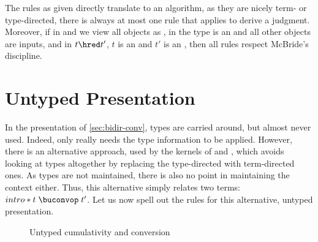 The rules as given directly translate to an algorithm, as they are nicely term- or type-directed,
\ie there is always at most one rule that applies to derive a judgment. Moreover,
if in  and  we view all objects as ,%
%
in  the type is an  and all other objects are inputs,
and in  $t \hred t'$, $t$ is an  and $t'$ is an , then
all rules respect McBride’s discipline.

\section{Untyped Presentation}
\label{sec:unty-conv}

\AP In the presentation of \cref{sec:bidir-conv}, types are carried around,
but almost never used. Indeed,
only  really needs the type information to be applied.
However, there is an alternative approach, used by the kernels of 
and , which avoids looking at types altogether by replacing the
type-directed  with term-directed ones.
As types are not maintained, there is also no point in maintaining the context either.
Thus, this alternative  simply relates two terms: $intro* \buconv{\gamma}{t}{t'}$.%
Let us now spell out the rules for this alternative, untyped presentation.

\begin{figure}[h]
  \ContinuedFloat*
  \caption{Untyped cumulativity and conversion}
  \label{fig:gene-ucum}
\end{figure}

